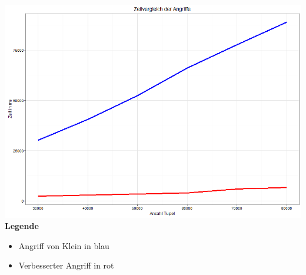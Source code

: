 \documentclass[10pt,a4paper]{article}
\begin{document}
\includegraphics[width=\textwidth]{img/vergleich.png}
\label{fig:vergleich}
\\
\textbf{Legende}
\begin{itemize}
	\item[] Angriff von Klein in blau
	\item[] Verbesserter Angriff in rot
\end{itemize}


\newpage

\nocite{*}
\printbibliography
\end{document}
